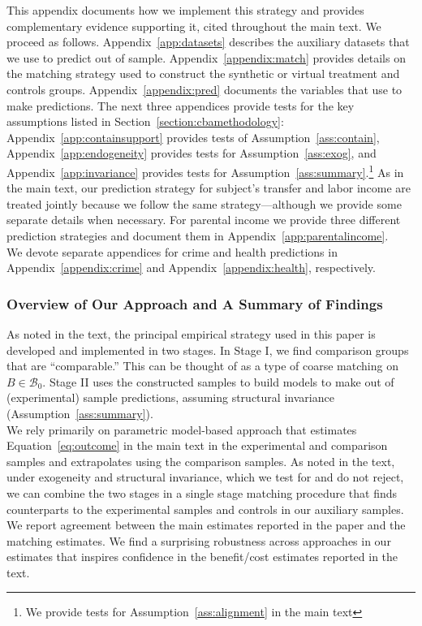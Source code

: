 \noindent This appendix documents how we implement this strategy and provides complementary evidence supporting it, cited throughout the main text. We proceed as follows. Appendix~\ref{app:datasets} describes the auxiliary datasets that we use to predict out of sample. Appendix~\ref{appendix:match} provides details on the matching strategy used to construct the synthetic or virtual treatment and controls groups. Appendix~\ref{appendix:pred} documents the variables that use to make predictions. The next three appendices provide tests for the key assumptions listed in Section~\ref{section:cbamethodology}: Appendix~\ref{app:containsupport} provides tests of Assumption~\ref{ass:contain}, Appendix~\ref{app:endogeneity} provides tests for Assumption~\ref{ass:exog}, and Appendix~\ref{app:invariance} provides tests for Assumption~\ref{ass:summary}.\footnote{We provide tests for Assumption~\ref{ass:alignment} in the main text} As in the main text, our prediction strategy for subject's transfer and labor income are treated jointly because we follow the same strategy---although we provide some separate details when necessary. For parental income we provide three different prediction strategies and document them in Appendix~\ref{app:parentalincome}.\\

\noindent We devote separate appendices for crime and health predictions in Appendix~\ref{appendix:crime} and Appendix~\ref{appendix:health}, respectively.

\subsubsection{Overview of Our Approach and A Summary of Findings}

\noindent As noted in the text, the principal empirical strategy used in this paper is developed and implemented in two stages. In Stage I, we find comparison groups that are ``comparable.'' This can be thought of as a type of coarse matching on $B \in \mathcal{B}_0$. Stage II uses the constructed samples to build models to make out of (experimental) sample predictions, assuming structural invariance (Assumption~\ref{ass:summary}). \\

\noindent We rely primarily on parametric model-based approach that estimates Equation~\eqref{eq:outcome} in the main text in the experimental and comparison samples and extrapolates using the comparison samples. As noted in the text, under exogeneity and structural invariance, which we test for and do not reject, we can combine the two stages in a single stage matching procedure that finds counterparts to the experimental samples and controls in our auxiliary samples. We report agreement between the main estimates reported in the paper and the matching estimates. We find a surprising robustness across approaches in our estimates that inspires confidence in the benefit/cost estimates reported in the text.\\

